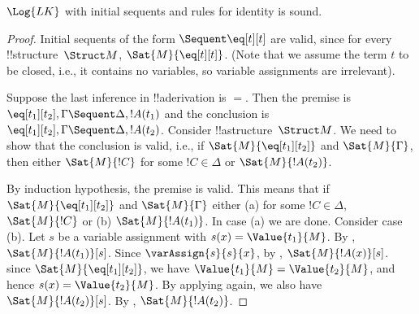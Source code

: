   



\begin{prop}
$\Log{LK}$ with initial sequents and rules for identity is sound.
\end{prop}

\begin{proof}
Initial sequents of the form ${} \Sequent \eq[t][t]$ are valid, since
for every !!{structure}~$\Struct M$, $\Sat{M}{\eq[t][t]}$. (Note that
we assume the term $t$ to be closed, i.e., it contains no variables,
so variable assignments are irrelevant).

Suppose the last inference in !!a{derivation} is $=$. Then the premise
is $\eq[t_1][t_2], \Gamma \Sequent \Delta, !A(t_1)$ and the conclusion
is $\eq[t_1][t_2], \Gamma \Sequent \Delta, !A(t_2)$. Consider
!!a{structure}~$\Struct M$. We need to show that the conclusion is
valid, i.e., if $\Sat{M}{\eq[t_1][t_2]}$ and $\Sat{M}{\Gamma}$, then
either $\Sat{M}{!C}$ for some $!C \in \Delta$ or $\Sat{M}{!A(t_2)}$.

By induction hypothesis, the premise is valid. This means that if
$\Sat{M}{\eq[t_1][t_2]}$ and $\Sat{M}{\Gamma}$ either (a) for some $!C
\in \Delta$, $\Sat{M}{!C}$ or (b) $\Sat{M}{!A(t_1)}$. In case (a) we
are done. Consider case (b).  Let $s$ be a variable assignment with
$s(x) = \Value{t_1}{M}$.  By ,
$\Sat{M}{!A(t_1)}[s]$. Since $\varAssign{s}{s}{x}$, by
, $\Sat{M}{!A(x)}[s]$. since
$\Sat{M}{\eq[t_1][t_2]}$, we have $\Value{t_1}{M} = \Value{t_2}{M}$,
and hence $s(x) = \Value{t_2}{M}$.  By applying
 again, we also have
$\Sat{M}{!A(t_2)}[s]$.  By ,
$\Sat{M}{!A(t_2)}$.
\end{proof}




\OLEndChapterHook





  

